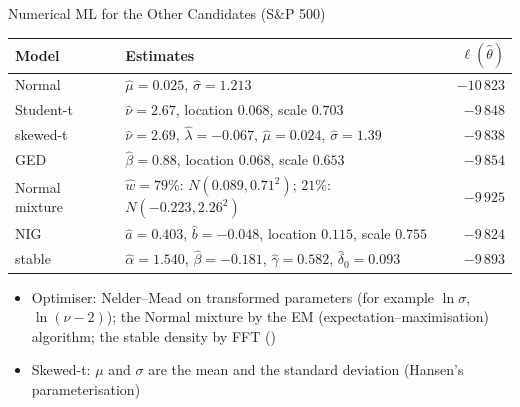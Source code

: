 \begin{frame}{Numerical ML for the Other Candidates (S\&P 500)}
\itemsize{\footnotesize}
\begin{center}
\scriptsize
\begin{tabular}{l>{\raggedright\arraybackslash}p{6.6cm}r}
\toprule
\textbf{Model} & \textbf{Estimates} & $\ell(\hat\theta)$ \\
\midrule
Normal & $\hat\mu = 0.025$, $\hat\sigma = 1.213$ & $-10\,823$ \\
Student-t & $\hat\nu = 2.67$, location $0.068$, scale $0.703$ & $-9\,848$ \\
skewed-t & $\hat\nu = 2.69$, $\hat\lambda = -0.067$, $\hat\mu = 0.024$, $\hat\sigma = 1.39$ & $-9\,838$ \\
GED & $\hat\beta = 0.88$, location $0.068$, scale $0.653$ & $-9\,854$ \\
Normal mixture & $\hat w = 79\%$: $N(0.089, 0.71^2)$; $21\%$: $N(-0.223, 2.26^2)$ & $-9\,925$ \\
NIG & $\hat a = 0.403$, $\hat b = -0.048$, location $0.115$, scale $0.755$ & $-9\,824$ \\
stable & $\hat\alpha = 1.540$, $\hat\beta = -0.181$, $\hat\gamma = 0.582$, $\hat\delta_0 = 0.093$ & $-9\,893$ \\
\bottomrule
\end{tabular}
\end{center}
\begin{itemize}
    \item Optimiser: Nelder--Mead on transformed parameters (for example $\ln\sigma$, $\ln(\nu - 2)$); the Normal mixture by the EM (expectation--maximisation) algorithm; the stable density by FFT ()
    \item Skewed-t: $\mu$ and $\sigma$ are the mean and the standard deviation (Hansen's parameterisation)
\end{itemize}
\end{frame}

